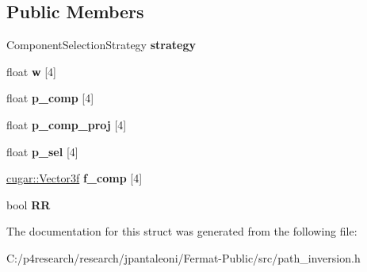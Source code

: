 \subsection*{Public Members}
\begin{DoxyCompactItemize}
\item 
\mbox{\label{struct_bsdf_inverse_a262472545c30b129c240bc31161dc2a9}} 
Component\+Selection\+Strategy {\bfseries strategy}
\item 
\mbox{\label{struct_bsdf_inverse_a01686ca07cef7e3267806e88df91a5ec}} 
float {\bfseries w} \mbox{[}4\mbox{]}
\item 
\mbox{\label{struct_bsdf_inverse_a8759d5a6a5ba7f1ffcb0e3747dd85b6a}} 
float {\bfseries p\+\_\+comp} \mbox{[}4\mbox{]}
\item 
\mbox{\label{struct_bsdf_inverse_a4c5942103d3810e77315e95988be0354}} 
float {\bfseries p\+\_\+comp\+\_\+proj} \mbox{[}4\mbox{]}
\item 
\mbox{\label{struct_bsdf_inverse_a7a8268fc09c2e9eaa9518475538b51de}} 
float {\bfseries p\+\_\+sel} \mbox{[}4\mbox{]}
\item 
\mbox{\label{struct_bsdf_inverse_a51b8bdeaf33391fa01ea60f00745a009}} 
\hyperlink{structcugar_1_1_vector}{cugar\+::\+Vector3f} {\bfseries f\+\_\+comp} \mbox{[}4\mbox{]}
\item 
\mbox{\label{struct_bsdf_inverse_a9c8e5333ce731adee5f2025e9aa011af}} 
bool {\bfseries RR}
\end{DoxyCompactItemize}


The documentation for this struct was generated from the following file\+:\begin{DoxyCompactItemize}
\item 
C\+:/p4research/research/jpantaleoni/\+Fermat-\/\+Public/src/path\+\_\+inversion.\+h\end{DoxyCompactItemize}
